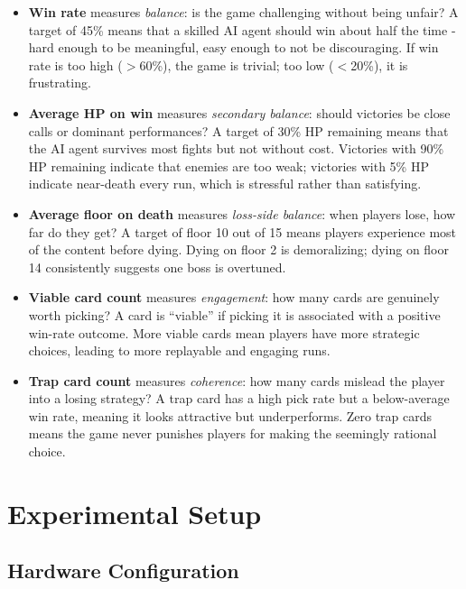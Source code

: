 \begin{itemize}
    \item \textbf{Win rate} measures \textit{balance}: is the game challenging without being unfair? A target of 45\% means that a skilled AI agent should win about half the time - hard enough to be meaningful, easy enough to not be discouraging. If win rate is too high ($>$60\%), the game is trivial; too low ($<$20\%), it is frustrating.
    \item \textbf{Average HP on win} measures \textit{secondary balance}: should victories be close calls or dominant performances? A target of 30\% HP remaining means that the AI agent survives most fights but not without cost. Victories with 90\% HP remaining indicate that enemies are too weak; victories with 5\% HP indicate near-death every run, which is stressful rather than satisfying.
    \item \textbf{Average floor on death} measures \textit{loss-side balance}: when players lose, how far do they get? A target of floor 10 out of 15 means players experience most of the content before dying. Dying on floor 2 is demoralizing; dying on floor 14 consistently suggests one boss is overtuned.
    \item \textbf{Viable card count} measures \textit{engagement}: how many cards are genuinely worth picking? A card is ``viable'' if picking it is associated with a positive win-rate outcome. More viable cards mean players have more strategic choices, leading to more replayable and engaging runs.
    \item \textbf{Trap card count} measures \textit{coherence}: how many cards mislead the player into a losing strategy? A trap card has a high pick rate but a below-average win rate, meaning it looks attractive but underperforms. Zero trap cards means the game never punishes players for making the seemingly rational choice.
\end{itemize}

\section{Experimental Setup}

\subsection{Hardware Configuration}

